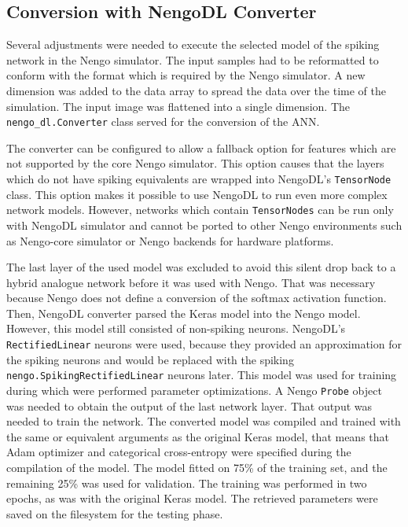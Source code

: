 \subsection{Conversion with NengoDL Converter}
Several adjustments were needed to execute the selected model of the spiking network in the Nengo simulator. The input samples had to be reformatted to conform with the format which is required by the Nengo simulator. A new dimension was added to the data array to spread the data over the time of the simulation. The input image was flattened into a single dimension. The \texttt{nengo\_dl.Converter} class served for the conversion of the ANN. \par
The converter can be configured to allow a fallback option for features which are not supported by the core Nengo simulator. This option causes that the layers which do not have spiking equivalents are wrapped into NengoDL's \texttt{TensorNode} class. This option makes it possible to use NengoDL to run even more complex network models. However, networks which contain \texttt{TensorNodes} can be run only with NengoDL simulator and cannot be ported to other Nengo environments such as Nengo-core simulator or Nengo backends for hardware platforms. \par
The last layer of the used model was excluded to avoid this silent drop back to a hybrid analogue network before it was used with Nengo. That was necessary because Nengo does not define a conversion of the softmax activation function. Then, NengoDL converter parsed the Keras model into the Nengo model. However, this model still consisted of non-spiking neurons. NengoDL's \texttt{RectifiedLinear} neurons were used, because they provided an approximation for the spiking neurons and would be replaced with the spiking \texttt{nengo.SpikingRectifiedLinear} neurons later. This model was used for training during which were performed parameter optimizations. A Nengo \texttt{Probe} object was needed to obtain the output of the last network layer. That output was needed to train the network. The converted model was compiled and trained with the same or equivalent arguments as the original Keras model, that means that Adam optimizer and categorical cross-entropy were specified during the compilation of the model. The model fitted on 75\% of the training set, and the remaining 25\% was used for validation. The training was performed in two epochs, as was with the original Keras model. The retrieved parameters were saved on the filesystem for the testing phase. \par
